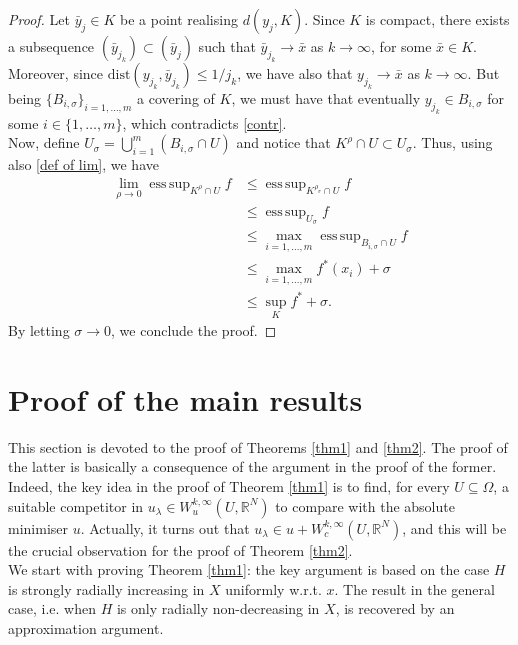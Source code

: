 \documentclass[a4paper,11pt]{article}
\numberwithin{equation}{section}
\newcommand{\numberset}{\mathbb}
\newcommand{\Om}{\Omega}
\newcommand{\R}{\numberset{R}}
\DeclareMathOperator*{\esssup}{ess\,sup}
\theoremstyle{definition}
\begin{document}
\begin{proof}
 Let $\bar y_j\in K$ be a point realising $d(y_j,K)$. Since $K$ is compact, there exists a subsequence $(\bar y_{j_k})\subset(\bar y_j)$ such that $\bar y_{j_k}\to \bar x$ as $k\to\infty$, for some $\bar x\in K$. Moreover, since $\mathrm{dist}(y_{j_k},\bar y_{j_k})\leq1/{j_k}$, we have also that $y_{j_k}\to \bar x$ as $k\to\infty$. But being $\{B_{i,\sigma}\}_{i=1,\ldots,m}$ a covering of $K$, we must have that eventually $y_{j_k}\in B_{i,\sigma}$ for some $i\in\{1,\ldots,m\}$, which contradicts \eqref{contr}.\\
Now, define $U_\sigma=\bigcup_{i=1}^m (B_{i,\sigma}\cap U)$ and notice that ${K^\rho\cap U}\subset U_\sigma$. Thus, using also \eqref{def of lim}, we have
\begin{align*}
\lim_{\rho\to0}\esssup_{K^\rho\cap U}f&\leq\esssup_{K^{\rho_\sigma}\cap U}f\\
&\leq \esssup_{U_\sigma}f\\
&\leq\max_{i=1,\ldots,m}\esssup_{B_{i,\sigma}\cap U}f\\
&\leq\max_{i=1,\ldots,m} f^*(x_i)+\sigma\\
&\leq\sup_K f^*+\sigma.
\end{align*}
By letting $\sigma\to0$, we conclude the proof.
\end{proof}





\section{Proof of the main results}\label{sec:proofs}
This section is devoted to the proof of Theorems \ref{thm1} and \ref{thm2}. The proof of the latter is basically a consequence of the argument in the proof of the former. Indeed, the key idea in the proof of Theorem \ref{thm1} is to find, for every $U\subseteq\Om$, a suitable competitor in $u_\lambda\in W^{k,\infty}_u(U,\R^N)$ to compare with the absolute minimiser $u$. Actually, it turns out that $u_\lambda\in u+W^{k,\infty}_c(U,\R^N)$, and this will be the crucial observation for the proof of Theorem \ref{thm2}.\\
We start with proving Theorem \ref{thm1}: the key argument is based on the case $H$ is strongly radially increasing in $X$ uniformly w.r.t. $x$. The result in the general case, i.e. when $H$ is only radially non-decreasing in $X$, is recovered by an approximation argument.\\
\end{document}
